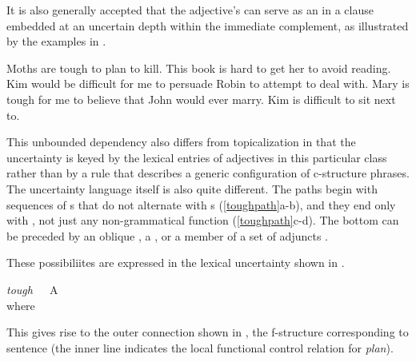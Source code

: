 \documentclass[output=paper,hidelinks]{langscibook}
\begin{document}
\noindent It is also generally accepted that the adjective's \SUBJ can serve as an \OBJ in a clause embedded at an uncertain depth within the immediate complement, as illustrated by the examples in .
 
\ea\label{toughlong}
\ea\label{toughlonga} Moths are tough to plan to kill.
\ex This book is hard to get her to avoid reading. \citep{dalrympleking2000} 
\ex\label{toughlongobl} Kim would be difficult for me to persuade Robin to attempt to deal with.  \citep{HukariLevine1991}
\ex\label{toughlongcomp} Mary is tough for me to believe that John would ever marry. \citep{kaplanbresnan82}
\ex\label{toughadj}Kim is difficult to sit next to. \citep{Grover1995}
\z\z

This unbounded dependency also differs from topicalization in that the uncertainty is keyed by the lexical entries of adjectives in this particular class rather than by a rule that describes a generic configuration of c-structure phrases.  The uncertainty language itself is also quite different. The paths begin with sequences of {\XCOMP}s that do not alternate with {\COMP}s (\ref{toughpath}a-b), and they end only with \OBJ, not just any non-\COMP grammatical function (\ref{toughpath}c-d).  The bottom \OBJ can be preceded by an oblique , a \COMP {}, or a member of a set of adjuncts .

\ea\label{toughpath}
\z\z

\noindent These possibiliites are expressed in the lexical uncertainty shown in .

\ea\label{toughentry}
\textit{tough}\ \ \ A\ \ \ \\
\hsp{8em}where 
\z

\noindent This gives rise to the outer connection shown in , the f-structure corresponding to sentence  (the inner  line indicates the local functional control relation for \textit{plan}).
\end{document}
